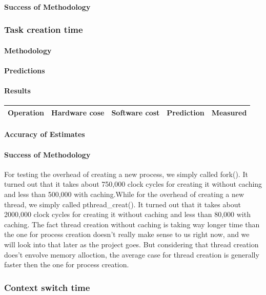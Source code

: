 \paragraph{Success of Methodology}


\subsubsection{Task creation time}
\paragraph{Methodology}
\paragraph{Predictions}
\paragraph{Results}

\begin{tabular}{| l | l | l | l | l |}
\hline
Operation & Hardware cose & Software cost & Prediction & Measured \\
\hline
\end{tabular}
\paragraph{Accuracy of Estimates}
\paragraph{Success of Methodology}
For testing the overhead of creating a new process, we simply called fork(). It turned out that it takes about 750,000 clock cycles for creating it without caching and less than 500,000 with caching.While for the overhead of creating a new thread, we simply called pthread\_creat(). It turned out that it takes about 2000,000 clock cycles for creating it without caching and less than 80,000 with caching.
The fact thread creation without caching is taking way longer time than the one for process creation doesn't really make sense to us right now, and we will look into that later as the project goes. But considering that thread creation does't envolve memory alloction, the average case for thread creation is generally faster then the one for process creation.


\subsubsection{Context switch time}
